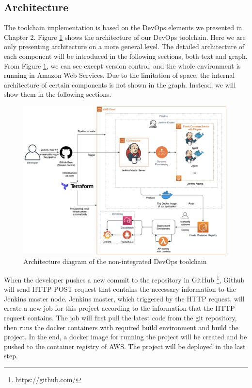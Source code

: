 \subsection{Architecture}
The toolchain implementation is based on the DevOps elements we presented in Chapter 2. Figure \ref{fig:archjenkins} shows the architecture of our DevOps toolchain. Here we are only presenting architecture on a more general level. The detailed architecture of each component will be introduced in the following sections, both text and graph. From Figure \ref{fig:archjenkins}, we can see except version control, and the whole environment is running in Amazon Web Services. Due to the limitation of space, the internal architecture of certain components is not shown in the graph. Instead, we will show them in the following sections.
\begin{figure}[!h]
     \centering
     \includegraphics[width=0.99\textwidth]{pics/arch-med-jenkins.png}
     \caption{Architecture diagram of the non-integrated DevOps toolchain}
     \label{fig:archjenkins}
\end{figure}
\par
When the developer pushes a new commit to the repository in GitHub \footnote{https://github.com/}, Github will send HTTP POST request that contains the necessary information to the Jenkins master node. Jenkins master, which triggered by the HTTP request, will create a new job for this project according to the information that the HTTP request contains. The job will first pull the latest code from the git repository, then runs the docker containers with required build environment and build the project. In the end, a docker image for running the project will be created and be pushed to the container registry of AWS. The project will be deployed in the last step.
